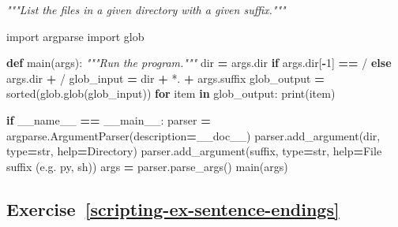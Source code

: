 \documentclass[
]{krantz}
\makeatletter
\newenvironment{Shaded}{\begin{snugshade}}{\end{snugshade}}
\newcommand{\BuiltInTok}[1]{#1}
\newcommand{\CommentTok}[1]{\textcolor[rgb]{0.56,0.35,0.01}{\textit{#1}}}
\newcommand{\ControlFlowTok}[1]{\textcolor[rgb]{0.13,0.29,0.53}{\textbf{#1}}}
\newcommand{\DecValTok}[1]{\textcolor[rgb]{0.00,0.00,0.81}{#1}}
\newcommand{\ImportTok}[1]{#1}
\newcommand{\KeywordTok}[1]{\textcolor[rgb]{0.13,0.29,0.53}{\textbf{#1}}}
\newcommand{\NormalTok}[1]{#1}
\newcommand{\OperatorTok}[1]{\textcolor[rgb]{0.81,0.36,0.00}{\textbf{#1}}}
\newcommand{\StringTok}[1]{\textcolor[rgb]{0.31,0.60,0.02}{#1}}
\newcommand{\VariableTok}[1]{\textcolor[rgb]{0.00,0.00,0.00}{#1}}
\newenvironment{kframe}{%
\medskip{}
\setlength{\fboxsep}{.8em}
 \def\at@end@of@kframe{}%
 \ifinner\ifhmode%
  \def\at@end@of@kframe{\end{minipage}}%
  \begin{minipage}{\columnwidth}%
 \fi\fi%
 \def\FrameCommand##1{\hskip\@totalleftmargin \hskip-\fboxsep
 \colorbox{shadecolor}{##1}\hskip-\fboxsep
     \hskip-\linewidth \hskip-\@totalleftmargin \hskip\columnwidth}%
 \MakeFramed {\advance\hsize-\width
   \@totalleftmargin\z@ \linewidth\hsize
   \@setminipage}}%
 {\par\unskip\endMakeFramed%
 \at@end@of@kframe}
\renewenvironment{Shaded}{\begin{kframe}}{\end{kframe}}
\makeatother
\begin{document}
\begin{Shaded}
\begin{Highlighting}[]
\CommentTok{"""List the files in a given directory with a given suffix."""}

\ImportTok{import}\NormalTok{ argparse}
\ImportTok{import}\NormalTok{ glob}


\KeywordTok{def}\NormalTok{ main(args):}
    \CommentTok{"""Run the program."""}
    \BuiltInTok{dir} \OperatorTok{=}\NormalTok{ args.}\BuiltInTok{dir} \ControlFlowTok{if}\NormalTok{ args.}\BuiltInTok{dir}\NormalTok{[}\OperatorTok{{-}}\DecValTok{1}\NormalTok{] }\OperatorTok{==} \StringTok{\textquotesingle{}/\textquotesingle{}} \ControlFlowTok{else}\NormalTok{ args.}\BuiltInTok{dir} \OperatorTok{+} \StringTok{\textquotesingle{}/\textquotesingle{}}
\NormalTok{    glob\_input }\OperatorTok{=} \BuiltInTok{dir} \OperatorTok{+} \StringTok{\textquotesingle{}*.\textquotesingle{}} \OperatorTok{+}\NormalTok{ args.suffix}
\NormalTok{    glob\_output }\OperatorTok{=} \BuiltInTok{sorted}\NormalTok{(glob.glob(glob\_input))}
    \ControlFlowTok{for}\NormalTok{ item }\KeywordTok{in}\NormalTok{ glob\_output:}
        \BuiltInTok{print}\NormalTok{(item)}


\ControlFlowTok{if} \VariableTok{\_\_name\_\_} \OperatorTok{==} \StringTok{\textquotesingle{}\_\_main\_\_\textquotesingle{}}\NormalTok{:}
\NormalTok{    parser }\OperatorTok{=}\NormalTok{ argparse.ArgumentParser(description}\OperatorTok{=}\NormalTok{\_\_doc\_\_)}
\NormalTok{    parser.add\_argument(}\StringTok{\textquotesingle{}dir\textquotesingle{}}\NormalTok{, }\BuiltInTok{type}\OperatorTok{=}\BuiltInTok{str}\NormalTok{, }\BuiltInTok{help}\OperatorTok{=}\StringTok{\textquotesingle{}Directory\textquotesingle{}}\NormalTok{)}
\NormalTok{    parser.add\_argument(}\StringTok{\textquotesingle{}suffix\textquotesingle{}}\NormalTok{, }\BuiltInTok{type}\OperatorTok{=}\BuiltInTok{str}\NormalTok{, }\BuiltInTok{help}\OperatorTok{=}\StringTok{\textquotesingle{}File suffix (e.g. py, sh)\textquotesingle{}}\NormalTok{)}
\NormalTok{    args }\OperatorTok{=}\NormalTok{ parser.parse\_args()}
\NormalTok{    main(args)}
\end{Highlighting}
\end{Shaded}

\hypertarget{exercise-refscripting-ex-sentence-endings}{%
\subsection*{Exercise~\ref{scripting-ex-sentence-endings}}\label{exercise-refscripting-ex-sentence-endings}}
\end{document}

